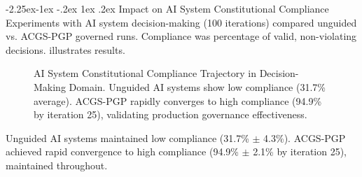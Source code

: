 \documentclass[manuscript,screen,9pt]{acmart}
\makeatletter
\renewcommand\subsection{\@startsection{subsection}{2}{\z@}%
  {-2.25ex\@plus -1ex \@minus -.2ex}%
  {1ex \@plus .2ex}%
  {\normalfont\large\bfseries}}
\makeatother
\begin{document}
\begin{table}[!htb]
\subsection{Impact on AI System Constitutional Compliance}
\label{subsec:impact_compliance}
Experiments with AI system decision-making (100 iterations) compared unguided vs. ACGS-PGP governed runs. Compliance was percentage of valid, non-violating decisions.  illustrates results.
\FloatBarrier %
\begin{figure}[!htb]
\centering
\caption[AI System Constitutional Compliance Trajectory]{AI System Constitutional Compliance Trajectory in Decision-Making Domain. Unguided AI systems show low compliance (31.7\% average). ACGS-PGP rapidly converges to high compliance (94.9\% by iteration 25), validating production governance effectiveness.}
\label{fig:compliance_over_generations}
\end{figure}
Unguided AI systems maintained low compliance (31.7\% $\pm$ 4.3\%). ACGS-PGP achieved rapid convergence to high compliance (94.9\% $\pm$ 2.1\% by iteration 25), maintained throughout.


\end{table}
\end{document}
